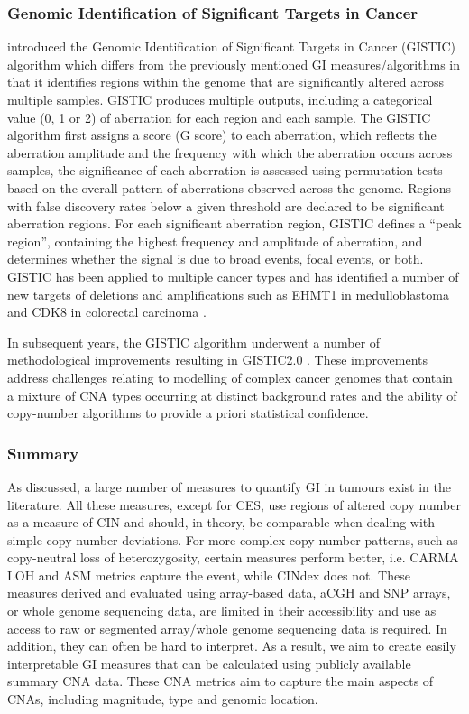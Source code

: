 \subsubsection{Genomic Identification of Significant Targets in Cancer} 
\cite{pmid18077431} introduced the Genomic Identification of Significant Targets in Cancer (GISTIC) algorithm which differs from the previously mentioned GI measures/algorithms in that it identifies regions within the genome that are significantly altered across multiple samples. GISTIC produces multiple outputs, including a categorical value (0, 1 or 2) of aberration for each region and each sample. The GISTIC algorithm first assigns a score (G score) to each aberration, which reflects the aberration amplitude and the frequency with which the aberration occurs across samples, the significance of each aberration is assessed using permutation tests based on the overall pattern of aberrations observed across the genome. Regions with false discovery rates below a given threshold are declared to be significant aberration regions. For each significant aberration region, GISTIC defines a “peak region”, containing the highest frequency and amplitude of aberration, and determines whether the signal is due to broad events, focal events, or both.    
GISTIC has been applied to multiple cancer types and has identified a number of new targets of deletions and amplifications such as EHMT1 in medulloblastoma and CDK8 in colorectal carcinoma \citep{pmid21527027}. 
 
In subsequent years, the GISTIC algorithm underwent a number of methodological improvements resulting in GISTIC2.0 \citep{pmid21527027}. These improvements address challenges relating to modelling of complex cancer genomes that contain a mixture of CNA types occurring at distinct background rates and the ability of copy-number algorithms to provide a priori statistical confidence. 

\subsubsection{Summary}
As discussed, a large number of measures to quantify GI in tumours exist in the literature. All these measures, except for CES, use regions of altered copy number as a measure of CIN and should, in theory, be comparable when dealing with simple copy number deviations. For more complex copy number patterns, such as copy-neutral loss of heterozygosity, certain measures perform better, i.e. CARMA LOH and ASM metrics capture the event, while CINdex does not. These measures derived and evaluated using array-based data, aCGH and SNP arrays, or whole genome sequencing data, are limited in their accessibility and use as access to raw or segmented array/whole genome sequencing data is required. In addition, they can often be hard to interpret. As a result, we aim to create easily interpretable GI measures that can be calculated using publicly available summary CNA data. These CNA metrics aim to capture the main aspects of CNAs, including magnitude, type and genomic location.

